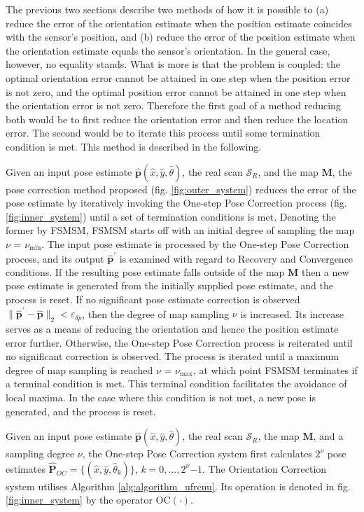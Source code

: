 The previous two sections describe two methods of how it is possible to (a)
reduce the error of the orientation estimate when the position estimate
coincides with the sensor's position, and (b) reduce the error of the position
estimate when the orientation estimate equals the sensor's orientation. In the
general case, however, no equality stands. What is more is that the problem is
coupled: the optimal orientation error cannot be attained in one step when the
position error is not zero, and the optimal position error cannot be attained
in one step when the orientation error is not zero. Therefore the first goal of
a method reducing both would be to first reduce the orientation error and then
reduce the location error. The second would be to iterate this process until
some termination condition is met. This method is described in the following.

Given an input pose estimate $\hat{\bm{p}}(\hat{x}, \hat{y}, \hat{\theta})$,
the real scan $\mathcal{S}_R$, and the map $\bm{M}$, the pose correction method
proposed (fig. \ref{fig:outer_system}) reduces the error of the pose estimate
by iteratively invoking the One-step Pose Correction process (fig.
\ref{fig:inner_system}) until a set of termination conditions is met. Denoting
the former by FSMSM, FSMSM starts off with an initial degree of sampling the
map $\nu$ = $\nu_{\min}$. The input pose estimate is processed by the One-step
Pose Correction process, and its output $\hat{\bm{p}}^\prime$ is examined with
regard to Recovery and Convergence conditions. If the resulting pose estimate
falls outside of the map $\bm{M}$ then a new pose estimate is generated from
the initially supplied pose estimate, and the process is reset. If no
significant pose estimate correction is observed
$\|\hat{\bm{p}}^\prime-\hat{\bm{p}}\|_2 < \varepsilon_{\delta p}$, then the
degree of map sampling $\nu$ is increased. Its increase serves as a means of
reducing the orientation and hence the position estimate error further.
Otherwise, the One-step Pose Correction process is reiterated until no
significant correction is observed. The process is iterated until a maximum
degree of map sampling is reached $\nu$ = $\nu_{\max}$, at which point FSMSM
terminates if a terminal condition is met. This terminal condition facilitates
the avoidance of local maxima. In the case where this condition is not met,
a new pose is generated, and the process is reset.



Given an input pose estimate $\hat{\bm{p}}(\hat{x}, \hat{y}, \hat{\theta})$,
the real scan $\mathcal{S}_R$, the map $\bm{M}$, and a sampling degree $\nu$,
the One-step Pose Correction system first calculates $2^\nu$ pose estimates
$\hat{\bm{P}}_{OC} = \{(\hat{x}, \hat{y}, \hat{\theta}_k)\}$,
$k = 0,\dots,2^\nu$$-$$1$. The Orientation Correction system utilises Algorithm
\ref{alg:algorithm_ufrcnu}. Its operation is denoted in fig.
\ref{fig:inner_system} by the operator OC$(\cdot)$.

